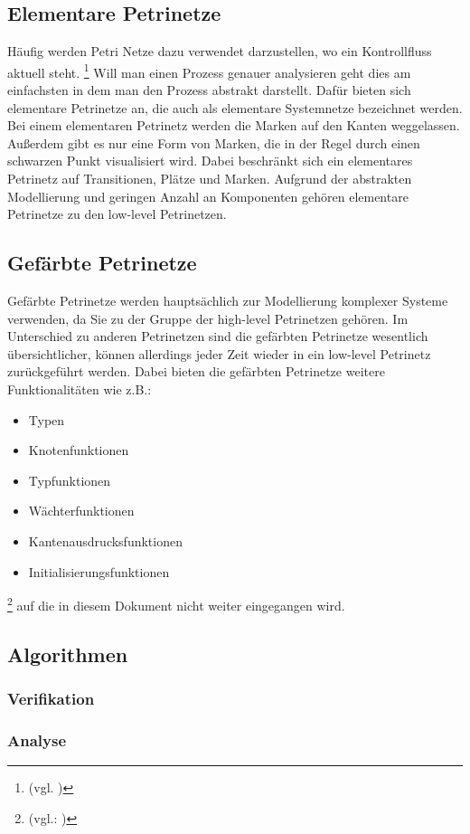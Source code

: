\subsection{Elementare Petrinetze}
Häufig werden Petri Netze dazu verwendet darzustellen, wo ein Kontrollfluss aktuell steht. \footnote{(vgl. \cite[Seite 39]{hu_berlin:petrinetze})}
Will man einen Prozess genauer analysieren geht dies am einfachsten in dem man den Prozess abstrakt darstellt.
Dafür bieten sich elementare Petrinetze an, die auch als elementare Systemnetze bezeichnet werden.\\
Bei einem elementaren Petrinetz werden die Marken auf den Kanten weggelassen. Außerdem gibt es nur eine Form von Marken, die in der Regel durch einen schwarzen Punkt \textbullet visualisiert wird.
Dabei beschränkt sich ein elementares Petrinetz auf Transitionen, Plätze und Marken.
Aufgrund der abstrakten Modellierung und geringen Anzahl an Komponenten gehören elementare Petrinetze zu den low-level Petrinetzen.

\subsection{Gefärbte Petrinetze}
Gefärbte Petrinetze werden hauptsächlich zur Modellierung komplexer Systeme verwenden, da Sie zu der Gruppe der high-level Petrinetzen gehören.
Im Unterschied zu anderen Petrinetzen sind die gefärbten Petrinetze wesentlich übersichtlicher, können allerdings jeder Zeit wieder in ein low-level Petrinetz zurückgeführt werden.
Dabei bieten die gefärbten Petrinetze weitere Funktionalitäten wie z.B.:
\begin{itemize}
    \item Typen
    \item Knotenfunktionen
    \item Typfunktionen
    \item Wächterfunktionen
    \item Kantenausdrucksfunktionen
    \item Initialisierungsfunktionen
\end{itemize}
\footnote{(vgl.: \cite{tu_dresden:petrinetze})}
auf die in diesem Dokument nicht weiter eingegangen wird.


\subsection{Algorithmen}

\subsubsection{Verifikation}

\subsubsection{Analyse}

